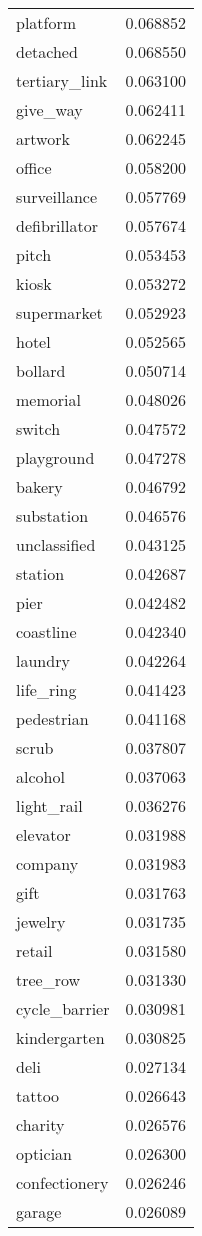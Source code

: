 \begin{tabular}{lr}
platform & 0.068852 \\
detached & 0.068550 \\
tertiary_link & 0.063100 \\
give_way & 0.062411 \\
artwork & 0.062245 \\
office & 0.058200 \\
surveillance & 0.057769 \\
defibrillator & 0.057674 \\
pitch & 0.053453 \\
kiosk & 0.053272 \\
supermarket & 0.052923 \\
hotel & 0.052565 \\
bollard & 0.050714 \\
memorial & 0.048026 \\
switch & 0.047572 \\
playground & 0.047278 \\
bakery & 0.046792 \\
substation & 0.046576 \\
unclassified & 0.043125 \\
station & 0.042687 \\
pier & 0.042482 \\
coastline & 0.042340 \\
laundry & 0.042264 \\
life_ring & 0.041423 \\
pedestrian & 0.041168 \\
scrub & 0.037807 \\
alcohol & 0.037063 \\
light_rail & 0.036276 \\
elevator & 0.031988 \\
company & 0.031983 \\
gift & 0.031763 \\
jewelry & 0.031735 \\
retail & 0.031580 \\
tree_row & 0.031330 \\
cycle_barrier & 0.030981 \\
kindergarten & 0.030825 \\
deli & 0.027134 \\
tattoo & 0.026643 \\
charity & 0.026576 \\
optician & 0.026300 \\
confectionery & 0.026246 \\
garage & 0.026089 \\

\end{tabular}
